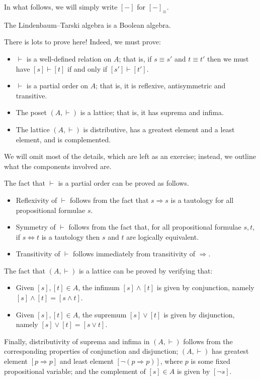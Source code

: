 In what follows, we will simply write $[{-}]$ for $[{-}]_{\equiv}$.

\begin{theorem}
\label{thmLindenbaumTarskiIsBooleanAlgebra}
The Lindenbaum--Tarski algebra is a Boolean algebra.
\end{theorem}
\begin{cproof}
There is lots to prove here! Indeed, we must prove:
\begin{itemize}
\item $\vdash$ is a well-defined relation on $A$; that is, if $s \equiv s'$ and $t \equiv t'$ then we must have $[s] \vdash [t]$ if and only if $[s'] \vdash [t']$.
\item $\vdash$ is a partial order on $A$; that is, it is reflexive, antisymmetric and transitive.
\item The poset $(A, \vdash)$ is a lattice; that is, it has suprema and infima.
\item The lattice $(A, \vdash)$ is distributive, has a greatest element and a least element, and is complemented.
\end{itemize}
We will omit most of the details, which are left as an exercise; instead, we outline what the components involved are.

The fact that $\vdash$ is a partial order can be proved as follows.
\begin{itemize}
\item Reflexivity of $\vdash$ follows from the fact that $s \Rightarrow s$ is a tautology for all propositional formulae $s$.
\item Symmetry of $\vdash$ follows from the fact that, for all propositional formulae $s,t$, if $s \Leftrightarrow t$ is a tautology then $s$ and $t$ are logically equivalent.
\item Transitivity of $\vdash$ follows immediately from transitivity of $\Rightarrow$.
\end{itemize}

The fact that $(A, \vdash)$ is a lattice can be proved by verifying that:
\begin{itemize}
\item Given $[s],[t] \in A$, the infimum $[s] \wedge [t]$ is given by conjunction, namely $[s] \wedge [t] = [s \wedge t]$.
\item Given $[s],[t] \in A$, the supremum $[s] \vee [t]$ is given by disjunction, namely $[s] \vee [t] = [s \vee t]$.
\end{itemize}

Finally, distributivity of suprema and infima in $(A, \vdash)$ follows from the corresponding properties of conjunction and disjunction; $(A, \vdash)$ has greatest element $[p \Rightarrow p]$ and least element $[\neg(p \Rightarrow p)]$, where $p$ is some fixed propositional variable; and the complement of $[s] \in A$ is given by $[\neg s]$.
\end{cproof}

